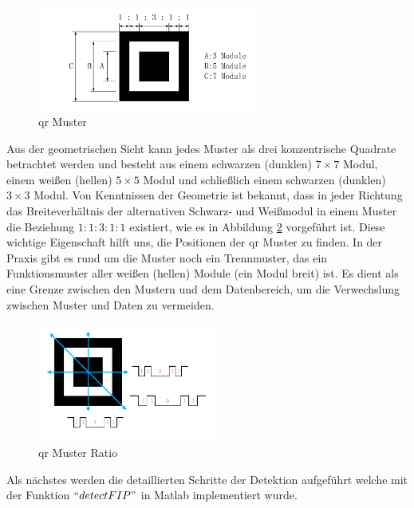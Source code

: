 \begin{figure}[H]
 \centering 
 \includegraphics[keepaspectratio,width=0.65\textwidth]{images/3_Ersteverfahren/QRMuster/QRPattern.pdf}
 \caption{\gls{qr} Muster}
 \label{fig:QRPattern}
\end{figure}

Aus der geometrischen Sicht kann jedes Muster als drei konzentrische Quadrate betrachtet werden und besteht aus einem schwarzen (dunklen) $7 \times 7$ Modul, einem weißen (hellen) $5 \times 5$ Modul und schließlich einem schwarzen (dunklen) $3 \times 3$ Modul. Von Kenntnissen der Geometrie ist bekannt, dass in jeder Richtung das Breiteverhältnis der alternativen Schwarz- und Weißmodul in einem Muster die Beziehung $1:1:3:1:1$ existiert, wie es in Abbildung \ref{fig:QRPatternRatio} vorgeführt ist. Diese wichtige Eigenschaft hilft uns, die Positionen der \gls{qr} Muster zu finden. In der Praxis gibt es rund um die Muster noch ein Trennmuster, das ein Funktionsmuster aller weißen (hellen) Module (ein Modul breit) ist. Es dient als eine Grenze zwischen den Mustern und dem Datenbereich, um die Verwechslung zwischen Muster und Daten zu vermeiden.
 
 \begin{figure}[H]
 \centering 
 \includegraphics[keepaspectratio,width=0.52\textwidth]{images/3_Ersteverfahren/QRMuster/QP_Patternratio.pdf}
 \caption{\gls{qr} Muster Ratio}
 \label{fig:QRPatternRatio}
\end{figure}

Als nächstes werden die detaillierten Schritte der Detektion aufgeführt welche mit der Funktion $ ``detectFIP" $ in Matlab implementiert wurde.

